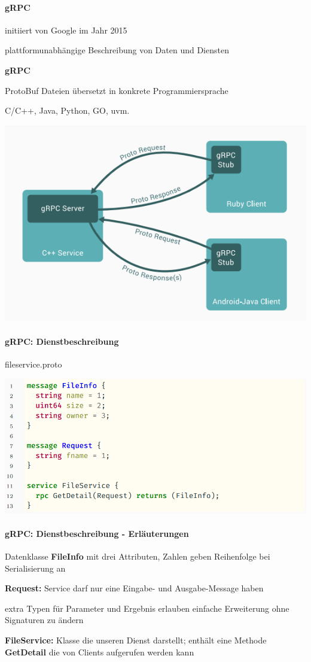 \documentclass[10pt]{article}
\begin{document}
\paragraph{gRPC}

\begin{itemize*}
  \item initiiert von Google im Jahr 2015
  \item plattformunabhängige Beschreibung von Daten und Diensten
\end{itemize*}
\color{orange} \textbf{gRPC} \color{black}
\begin{itemize*}
  \item ProtoBuf Dateien übersetzt in konkrete Programmiersprache
  \item C/C++, Java, Python, GO, uvm.
\end{itemize*}
\begin{center}
  \includegraphics[width=0.45\linewidth]{Assets/Programmierparadigmen-grpc}
\end{center}

\paragraph{gRPC: Dienstbeschreibung}

fileservice.proto
\begin{center}
  \includegraphics[width=0.4\linewidth]{Assets/Programmierparadigmen-code-snippet-84}
\end{center}

\paragraph{gRPC: Dienstbeschreibung - Erläuterungen}

\begin{itemize*}
  \item Datenklasse \textbf{FileInfo} mit drei Attributen, Zahlen geben Reihenfolge bei Serialisierung an
  \item \textbf{Request:} Service darf nur eine Eingabe- und Ausgabe-Message haben
  \begin{itemize*}
    \item extra Typen für Parameter und Ergebnis erlauben einfache Erweiterung ohne Signaturen zu ändern
  \end{itemize*}
  \item \textbf{FileService:} Klasse die unseren Dienst darstellt; enthält eine Methode \textbf{GetDetail} die von Clients aufgerufen werden kann
\end{itemize*}
\end{document}
